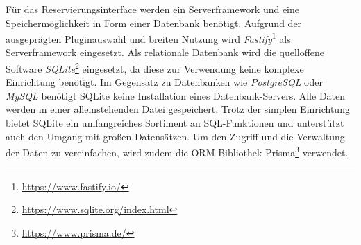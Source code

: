 Für das Reservierungsinterface werden ein Serverframework und eine
Speichermöglichkeit in Form einer Datenbank benötigt. Aufgrund der ausgeprägten
Pluginauswahl und breiten Nutzung wird
\textit{Fastify}\footnote{\url{https://www.fastify.io/}} als Serverframework
eingesetzt. Als relationale Datenbank wird die quelloffene Software
\textit{SQLite}\footnote{\url{https://www.sqlite.org/index.html}} eingesetzt, da
diese zur Verwendung keine komplexe Einrichtung benötigt. Im Gegensatz zu
Datenbanken wie \textit{PostgreSQL} oder \textit{MySQL} benötigt SQLite keine
Installation eines Datenbank-Servers. Alle Daten werden in einer alleinstehenden
Datei gespeichert. Trotz der simplen Einrichtung bietet SQLite ein umfangreiches
Sortiment an SQL-Funktionen und unterstützt auch den Umgang mit großen
Datensätzen. Um den Zugriff und die Verwaltung der Daten zu vereinfachen, wird
zudem die ORM-Bibliothek Prisma\footnote{\url{https://www.prisma.de/}}
verwendet.

